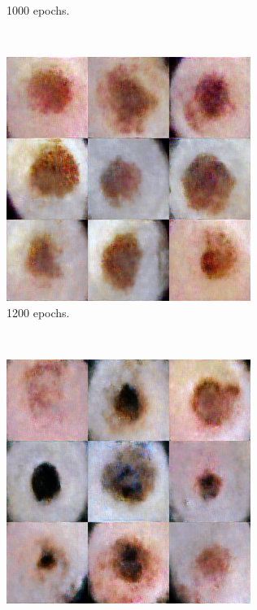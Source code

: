 \documentclass[conference]{IEEEtran}
\begin{document}
\begin{figure}
\begin{subfigure}[b]{0.15\textwidth}
        \caption{1000 epochs.}
        \label{fig:5}
    \end{subfigure}
    ~
    \begin{subfigure}[b]{0.15\textwidth}
        \includegraphics[width=\textwidth]{9.png}
        \caption{1200 epochs.}
        \label{fig:6}
    \end{subfigure}
   ~
     \begin{subfigure}[b]{0.15\textwidth}
        \includegraphics[width=\textwidth]{10.png}

\end{subfigure}
\end{figure}
\end{document}
